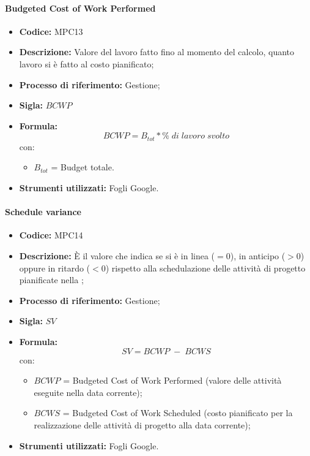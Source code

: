 \paragraph{Budgeted Cost of Work Performed}
\begin{itemize}
	\item \textbf{Codice:} MPC13
	\item \textbf{Descrizione:} Valore del lavoro fatto fino al momento del calcolo, quanto lavoro si è fatto al costo pianificato;
	\item \textbf{Processo di riferimento:} Gestione;
	\item \textbf{Sigla:} $BCWP$
	\item \textbf{Formula:} $$BCWP = {B_{tot} * \% \;di\; lavoro\; svolto}$$
	con:
	\begin{itemize}
		\item $B_{tot}$ = Budget totale.
	\end{itemize}
	\item \textbf{Strumenti utilizzati:} Fogli Google.
\end{itemize}

\paragraph{Schedule variance}
\begin{itemize}
	\item \textbf{Codice:} MPC14
	\item \textbf{Descrizione:} È il valore che indica se si è in linea ($=0$), in anticipo ($>0$) oppure in ritardo ($<0$) rispetto alla schedulazione delle attività di progetto pianificate nella ;
	\item \textbf{Processo di riferimento:} Gestione;
	\item \textbf{Sigla:} $SV$
	\item \textbf{Formula:} $$SV = {BCWP \; - \; BCWS}$$
	con:
	\begin{itemize}
		\item $BCWP$ = Budgeted Cost of Work Performed (valore delle attività eseguite nella data corrente);
		\item $BCWS$ = Budgeted Cost of Work Scheduled (costo pianificato per la realizzazione delle attività di progetto alla data corrente);
	\end{itemize}
	\item \textbf{Strumenti utilizzati:} Fogli Google.
\end{itemize}

